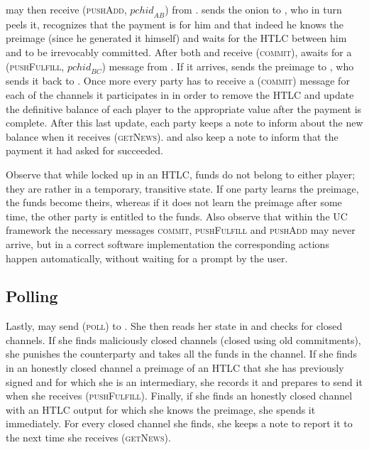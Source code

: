     \bob{} may then receive (\textsc{pushAdd}, $\mathit{pchid}_{AB}$)
    from \environment. \bob{} sends the onion to \charlie, who in turn peels it,
    recognizes that the payment is for him and that indeed he knows the preimage
    (since he generated it himself) and waits for the HTLC between him and
    \bob{} to be irrevocably committed. After both \bob{} and \charlie{} receive
    (\textsc{commit}), \charlie{} awaits for a (\textsc{pushFulfill},
    $\mathit{pchid}_{BC}$) message from \environment. If it arrives,
    \charlie{} sends the preimage to \bob, who sends it back to \alice. Once
    more every party has to receive a (\textsc{commit}) message for each of the
    channels it participates in in order to remove the HTLC and update
    the definitive balance of each player to the appropriate value after the
    payment is complete. After this last update, each party keeps a note to
    inform \environment{} about the new balance when it receives
    (\textsc{getNews}). \alice{} and \charlie{} also keep a note to
    inform \environment{} that the payment it had asked for succeeded.

    Observe that while locked up in an HTLC, funds do not belong to either
    player; they are rather in a temporary, transitive state. If one party
    learns the preimage, the funds become theirs, whereas if it does not learn
    the preimage after some time, the other party is entitled to the funds. Also
    observe that within the UC framework the necessary messages \textsc{commit},
    \textsc{pushFulfill} and \textsc{pushAdd} may never arrive, but in a
    correct software implementation the corresponding actions happen
    automatically, without waiting for a prompt by the user.

  \subsection{Polling}
    Lastly, \environment{} may send (\textsc{poll}) to \alice. She then reads
    her state in \ledger{} and checks for closed channels. If she finds
    maliciously closed channels (closed using old commitments), she punishes the
    counterparty and takes all the funds in the channel. If she finds in an
    honestly closed channel a preimage of an HTLC that she has previously
    signed and for which she is an intermediary, she records it and prepares to
    send it when she receives (\textsc{pushFulfill}). Finally, if she finds an
    honestly closed channel with an HTLC output for which she knows the
    preimage, she spends it immediately. For every closed channel she finds, she
    keeps a note to report it to \environment{} the next time she receives
    (\textsc{getNews}).

